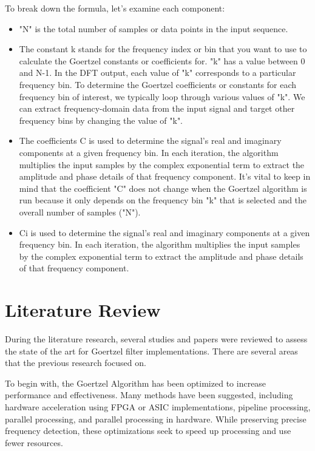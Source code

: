 \documentclass{article}
\begin{document}
To break down the formula, let's examine each component:
\begin{itemize}
    \item 	"N" is the total number of samples or data points in the input sequence.
    \item The constant k stands for the frequency index or bin that you want to use to calculate the Goertzel constants or coefficients for. "k" has a value between 0 and N-1. In the DFT output, each value of "k" corresponds to a particular frequency bin. To determine the Goertzel coefficients or constants for each frequency bin of interest, we typically loop through various values of "k". We can extract frequency-domain data from the input signal and target other frequency bins by changing the value of "k".
    \item The coefficients C is used to determine the signal's real and imaginary components at a given frequency bin. In each iteration, the algorithm multiplies the input samples by the complex exponential term to extract the amplitude and phase details of that frequency component. It's vital to keep in mind that the coefficient "C" does not change when the Goertzel algorithm is run because it only depends on the frequency bin "k" that is selected and the overall number of samples ("N").
    \item Ci is used to determine the signal's real and imaginary components at a given frequency bin. In each iteration, the algorithm multiplies the input samples by the complex exponential term to extract the amplitude and phase details of that frequency component.
\end{itemize}

\section{Literature Review}
During the literature research, several studies and papers were reviewed to assess the state of the art for Goertzel filter implementations. There are several areas that the previous research focused on. 

To begin with, the Goertzel Algorithm has been optimized to increase performance and effectiveness. Many methods have been suggested, including hardware acceleration using FPGA or ASIC implementations, pipeline processing, parallel processing, and parallel processing in hardware. While preserving precise frequency detection, these optimizations seek to speed up processing and use fewer resources.
\end{document}
